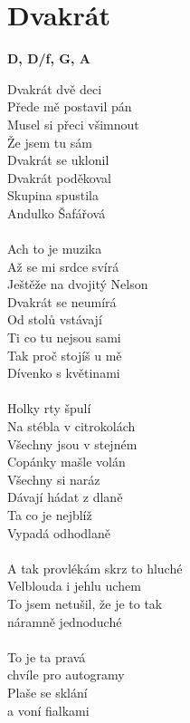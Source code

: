 \section{Dvakrát}
\footnotesize\textbf{D, D/f\kr , G, A}\\
\normalsize
\begin{multicols}{2}
Dvakrát dvě deci\\
Přede mě postavil pán\\
Musel si přeci všimnout\\
Že jsem tu sám\\
Dvakrát se uklonil\\
Dvakrát poděkoval\\
Skupina spustila\\
Andulko Šafářová\\
\\
Ach to je muzika\\
Až se mi srdce svírá\\
Ještěže na dvojitý Nelson\\
Dvakrát se neumírá\\
Od stolů vstávají\\
Ti co tu nejsou sami\\
Tak proč stojíš u mě\\
Dívenko s květinami\\
\\
Holky rty špulí\\
Na stébla v citrokolách\\
Všechny jsou v stejném\\
Copánky mašle volán\\
Všechny si naráz\\
Dávají hádat z dlaně\\
Ta co je nejblíž\\
Vypadá odhodlaně\\
\\ 
A tak provlékám skrz to hluché\\
Velblouda i jehlu uchem\\
To jsem netušil, že je to tak\\
náramně jednoduché\\
\columnbreak
\\
To je ta pravá\\
chvíle pro autogramy\\
Plaše se sklání\\
a voní fialkami\\

\end{multicols}
